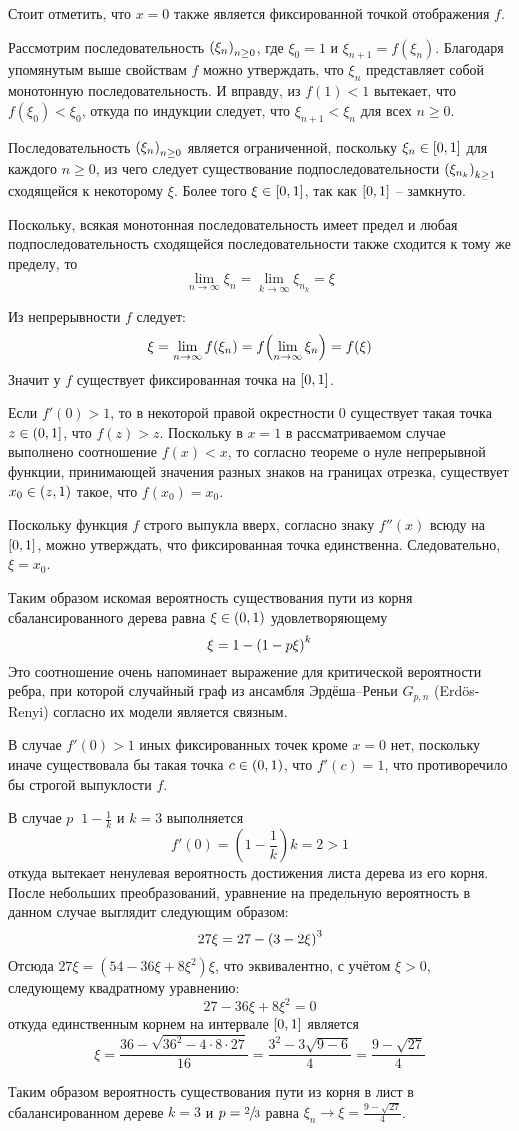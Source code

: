 \documentclass[a4paper]{article}
\let\originalleft\left
\let\originalright\right
\renewcommand{\left}{\mathopen{}\mathclose\bgroup\originalleft}
\renewcommand{\right}{\aftergroup\egroup\originalright}
\newcommand{\clo}[1]{{\left [ #1 \right ]}}
\newcommand{\ploc}[1]{{\left ( #1 \right ]}}
\newcommand{\brac}[1]{{\left ( #1 \right )}}
\newcommand{\defn}{{\mathop{\overset{\Delta}{=}}\nolimits}}
\newcommand{\eng}[1]{\foreignlanguage{english}{#1}}
\begin{document}
Стоит отметить, что $x=0$ также является фиксированной точкой отображения $f$.

Рассмотрим последовательность $\brac{\xi_n}_{n\geq 0}$, где $\xi_0 = 1$ и 
$\xi_{n+1} = f(\xi_n)$.
Благодаря упомянутым выше свойствам $f$ можно утверждать, что $\xi_n$
представляет собой монотонную последовательность.
И вправду, из $f(1) < 1$ вытекает, что $f(\xi_0)<\xi_0$, откуда по индукции
следует, что $\xi_{n+1}<\xi_n$ для всех $n\geq 0$.

Последовательность $\brac{\xi_n}_{n\geq0}$ является ограниченной, поскольку
$\xi_n\in\clo{0,1}$ для каждого $n\geq 0$, из чего следует существование
подпоследовательности $\brac{\xi_{n_k}}_{k\geq 1}$ сходящейся к некоторому
$\xi$.
Более того $\xi\in \clo{0,1}$, так как $\clo{0,1}$ -- замкнуто.

Поскольку, всякая монотонная последовательность имеет предел и любая
подпоследовательность сходящейся последовательности также сходится к тому же
пределу, то
\[\lim_{n\to \infty} \xi_n = \lim_{k\to \infty} \xi_{n_k} = \xi \]

Из непрерывности $f$ следует:
\[\xi = \lim_{n\to \infty} f(\xi_n) = f\brac{\lim_{n \to\infty}\xi_n} = f(\xi)\]
Значит у $f$ существует фиксированная точка на $\clo{0,1}$.

Если $f'(0)>1$, то в некоторой правой окрестности $0$ существует такая точка
$z\in\ploc{0,1}$, что $f(z)>z$.
Поскольку в $x=1$ в рассматриваемом случае выполнено соотношение $f(x)<x$, то
согласно теореме о нуле непрерывной функции, принимающей значения разных
знаков на границах отрезка, существует $x_0\in \brac{z,1}$ такое,
что $f(x_0) = x_0$.

Поскольку функция $f$ строго выпукла вверх, согласно знаку $f''(x)$ всюду на
$\clo{0,1}$, можно утверждать, что фиксированная точка единственна.
Следовательно, $\xi=x_0$.

Таким образом искомая вероятность существования пути из корня
сбалансированного дерева равна $\xi\in \brac{0,1}$ удовлетворяющему
\[\xi = 1 - \brac{1 - p \xi }^k\]
Это соотношение очень напоминает выражение для критической вероятности ребра,
при которой случайный граф из ансамбля Эрдёша–Реньи $G_{p,n}$
(\eng{Erd\"os-Renyi}) согласно их модели является связным.

В случае $f'(0)>1$ иных фиксированных точек кроме $x=0$ нет, поскольку иначе
существовала бы такая точка $c\in \brac{0,1}$, что $f'(c)=1$, что
противоречило бы строгой выпуклости $f$.

В случае $p\defn 1-\frac{1}{k}$ и $k=3$ выполняется
\[f'(0) = (1-\frac{1}{k}) k = 2 > 1 \]
откуда вытекает ненулевая вероятность достижения листа дерева из его корня.
После небольших преобразований, уравнение на предельную вероятность в данном
случае выглядит следующим образом:
\[27 \xi = 27 - \brac{ 3 - 2 \xi }^3\]
Отсюда $27 \xi = ( 54 - 36 \xi + 8 \xi^2 )\xi$, что эквивалентно, с учётом
$\xi>0$, следующему квадратному уравнению:
\[27 - 36 \xi + 8 \xi^2 = 0\]
откуда единственным корнем на интервале $\clo{0,1}$ является
\[\xi = \frac{36 - \sqrt{ 36^2 - 4 \cdot 8\cdot 27}}{16}
= \frac{3^2 - 3 \sqrt{ 9-6 }}{4} = \frac{9 - \sqrt{ 27 }}{4}\]

Таким образом вероятность существования пути из корня в лист в сбалансированном
дереве $k=3$ и $p=\sfrac{2}{3}$ равна
$\xi_n \to \xi = \frac{9 - \sqrt{ 27 }}{4}$.



\end{document}
